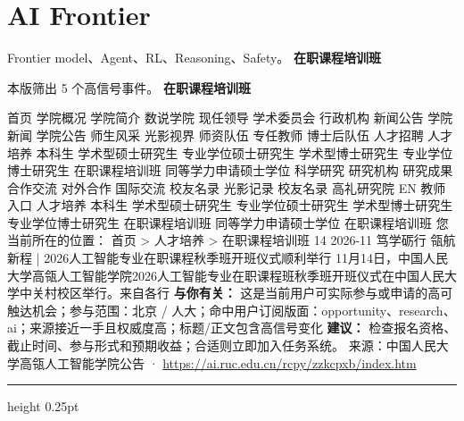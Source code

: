 \documentclass[10.5pt]{ctexart}
\begin{document}
\section*{AI Frontier}
{\color{ormuted} Frontier model、Agent、RL、Reasoning、Safety。}
\vspace{2mm}
{\LARGE\bfseries 在职课程培训班}\par
\vspace{1mm}
{\color{ormuted} 本版筛出 5 个高信号事件。}
\vspace{3mm}
{\Large\bfseries 在职课程培训班}\par
首页 学院概况 学院简介 数说学院 现任领导 学术委员会 行政机构 新闻公告 学院新闻 学院公告 师生风采 光影视界 师资队伍 专任教师 博士后队伍 人才招聘 人才培养 本科生 学术型硕士研究生 专业学位硕士研究生 学术型博士研究生 专业学位博士研究生 在职课程培训班 同等学力申请硕士学位 科学研究 研究机构 研究成果 合作交流 对外合作 国际交流 校友名录 光影记录 校友名录 高礼研究院 EN 教师入口 人才培养 本科生 学术型硕士研究生 专业学位硕士研究生 学术型博士研究生 专业学位博士研究生 在职课程培训班 同等学力申请硕士学位 在职课程培训班 您当前所在的位置： 首页 > 人才培养 > 在职课程培训班 14 2026-11 笃学砺行 瓴航新程 | 2026人工智能专业在职课程秋季班开班仪式顺利举行 11月14日，中国人民大学高瓴人工智能学院2026人工智能专业在职课程班秋季班开班仪式在中国人民大学中关村校区举行。来自各行
\textbf{与你有关：} 这是当前用户可实际参与或申请的高可触达机会；参与范围：北京 / 人大；命中用户订阅版面：opportunity、research、ai；来源接近一手且权威度高；标题/正文包含高信号变化
\textbf{建议：} 检查报名资格、截止时间、参与形式和预期收益；合适则立即加入任务系统。
{\footnotesize\color{ormuted} 来源：中国人民大学高瓴人工智能学院公告 · \url{https://ai.ruc.edu.cn/rcpy/zzkcpxb/index.htm}}
\vspace{4mm}
\hrule height 0.25pt
\vspace{3mm}
\end{document}
